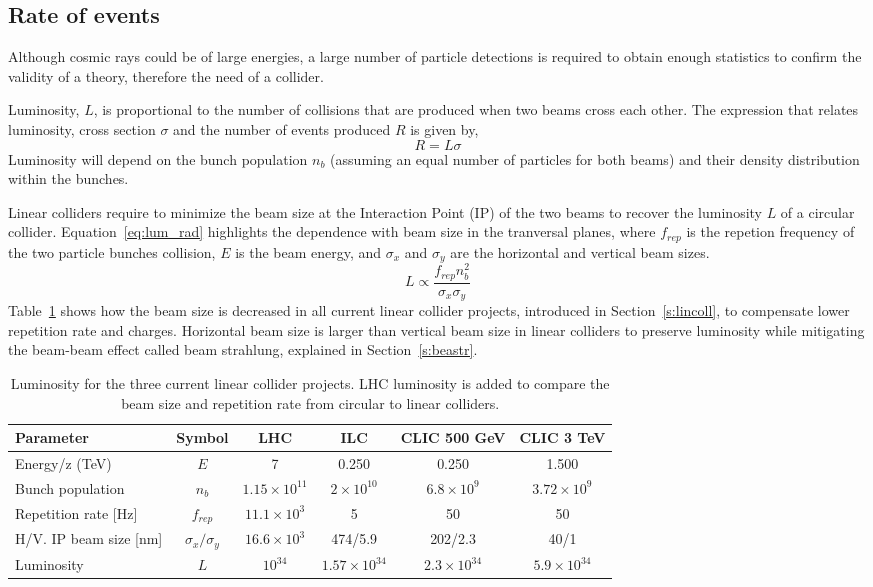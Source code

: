 \subsection{Rate of events}
Although cosmic rays could be of large energies, a large number of particle detections is required to obtain enough statistics to confirm the validity of a theory,  therefore the need of a collider.\par
Luminosity, $L$, is proportional to the number of collisions that are produced when two beams cross each other. The expression that relates luminosity, cross section $\sigma$ and the number of events produced $R$ is given by,
\begin{equation}
 R=L\sigma
\end{equation}
Luminosity will depend on the bunch population 	$n_b$ (assuming an equal number of particles for both beams) and their density distribution within the bunches.\par 
Linear colliders require to minimize the beam size at the Interaction Point (IP) of the two beams to recover the luminosity $L$ of a circular collider. Equation~\ref{eq:lum_rad} highlights the dependence with beam size in the tranversal planes, where $f_{rep}$ is the repetion frequency of the two particle bunches collision, $E$ is the beam energy, and $\sigma_x$ and $\sigma_y$ are the horizontal and vertical beam sizes.
\begin{equation}
 L \propto \frac{f_{rep}n_b^2}{\sigma_x\sigma_y}%
\end{equation}
Table~\ref{t:lum_rad} shows how the beam size is decreased in all current linear collider projects, introduced in Section~\ref{s:lincoll}, to compensate lower repetition rate and charges. Horizontal beam size is larger than vertical beam size in linear colliders to preserve luminosity while mitigating the beam-beam effect called beam strahlung, explained in Section~\ref{s:beastr}.\par
\begin{table}[h]
{\scriptsize
\centering
\begin{tabular}{l|c||c|c|c|c}\hline
Parameter & Symbol & LHC & ILC & CLIC 500 GeV& CLIC 3 TeV\\\hline\hline
Energy/z (TeV) & $E$& 7& 0.250 & 0.250 & 1.500\\
Bunch population & $n_b$ &$1.15\times10^{11}$&$2\times10^{10}$&$6.8\times10^9$&$3.72\times10^9$\\
Repetition rate [Hz] &$f_{rep}$& $11.1\times10^{3}$&5 &50&50\\
H/V. IP beam size [nm] & $\sigma_x/\sigma_y$&$16.6\times10^{3}$&474/5.9&202/2.3&40/1\\\hline
Luminosity &$L$& $10^{34}$ &$1.57\times10^{34}$ & $2.3\times10^{34}$&$5.9\times10^{34}$\\\hline
\end{tabular}\caption{Luminosity for the three current linear collider projects. LHC luminosity is added to compare the beam size and repetition rate from circular to linear colliders.}\label{t:lum_rad}
}
\end{table}

